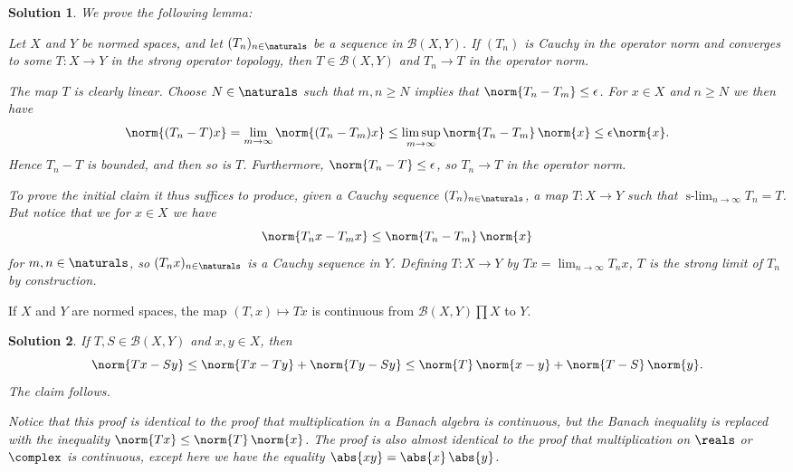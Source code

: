 \documentclass[article, a4paper, 11pt, oneside]{memoir}
\numberwithin{equation}{chapter}
\newcommand{\calB}{\mathcal{B}}
\DeclareMathOperator*{\slim}{s-lim}
\newenvironment{displaytheorem}{%
	\begin{displayquote}\itshape%
}{%
	\end{displayquote}%
}
\theoremstyle{nonumberplain}
\newtheorem{solution}{Solution}
\begin{document}
\begin{solution}
	We prove the following lemma:
	\begin{displaytheorem}
		Let $X$ and $Y$ be normed spaces, and let $(T_n)_{n\in\naturals}$ be a sequence in $\calB(X,Y)$. If $(T_n)$ is Cauchy in the operator norm and converges to some $T \colon X \to Y$ in the strong operator topology, then $T \in \calB(X,Y)$ and $T_n \to T$ in the operator norm.
	\end{displaytheorem}
	The map $T$ is clearly linear. Choose $N \in \naturals$ such that $m,n \geq N$ implies that $\norm{T_n - T_m} \leq \epsilon$. For $x \in X$ and $n \geq N$ we then have
	\begin{equation*}
		\norm{(T_n - T)x}
			= \lim_{m\to\infty} \norm{(T_n - T_m) x}
			\leq \limsup_{m\to\infty} \norm{T_n - T_m} \, \norm{x}
			\leq \epsilon \norm{x}.
	\end{equation*}
	Hence $T_n - T$ is bounded, and then so is $T$. Furthermore, $\norm{T_n - T} \leq \epsilon$, so $T_n \to T$ in the operator norm.

	To prove the initial claim it thus suffices to produce, given a Cauchy sequence $(T_n)_{n\in\naturals}$, a map $T \colon X \to Y$ such that $\slim_{n\to\infty} T_n = T$. But notice that we for $x \in X$ we have
	\begin{equation*}
		\norm{T_n x - T_m x}
			\leq \norm{T_n - T_m} \, \norm{x}
	\end{equation*}
	for $m,n \in \naturals$, so $(T_n x)_{n\in\naturals}$ is a Cauchy sequence in $Y$. Defining $T \colon X \to Y$ by $Tx = \lim_{n\to\infty} T_n x$, $T$ is the strong limit of $T_n$ by construction.
\end{solution}


\begin{exerciseframed*}[4]
	If $X$ and $Y$ are normed spaces, the map $(T,x) \mapsto Tx$ is continuous from $\calB(X,Y) \prod X$ to $Y$.
\end{exerciseframed*}

\begin{solution}
	If $T,S \in \calB(X,Y)$ and $x,y \in X$, then
	\begin{equation*}
		\norm{Tx - Sy}
			\leq \norm{Tx - Ty} + \norm{Ty - Sy}
			\leq \norm{T} \, \norm{x - y} + \norm{T - S} \, \norm{y}.
	\end{equation*}
	The claim follows.

	Notice that this proof is identical to the proof that multiplication in a Banach algebra is continuous, but the Banach inequality is replaced with the inequality $\norm{Tx} \leq \norm{T} \, \norm{x}$. The proof is also almost identical to the proof that multiplication on $\reals$ or $\complex$ is continuous, except here we have the \emph{equality} $\abs{xy} = \abs{x} \, \abs{y}$.
\end{solution}
\end{document}
